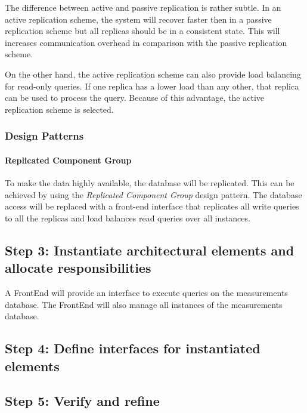 \npar The difference between active and passive replication is rather subtle.
In an active replication scheme, the system will recover faster then in a
passive replication scheme but all replicas should be in a consistent
state. This will increases communication overhead in comparison with the
passive replication scheme.

\npar On the other hand, the active replication scheme can also provide load
balancing for read-only queries. If one replica has a lower load than any other,
that replica can be used to process the query. Because of this advantage, the
active replication scheme is selected.

\subsubsection{Design Patterns}
\label{add:it4/patterns}

\paragraph{Replicated Component Group} 

\npar To make the data highly available, the database will be replicated. This
can be achieved by using the \emph{Replicated Component Group} design pattern.
The database access will be replaced with a front-end interface that replicates
all write queries to all the replicas and load balances read queries over all
instances.

\subsection{Step 3: Instantiate architectural elements and allocate responsibilities}
\label{add:it4/elements}

\npar A FrontEnd will provide an interface to execute queries on the
measurements database. The FrontEnd will also manage all instances of the
measurements database.

\subsection{Step 4: Define interfaces for instantiated elements}
\label{add:it4/interfaces}



\subsection{Step 5: Verify and refine}
\label{add:it4/verification}